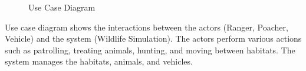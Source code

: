 \documentclass[a4paper,12pt]{article}
\begin{document}
\begin{figure}[H]
    \centering
    \caption{Use Case Diagram}
    \label{fig:use-case}
\end{figure}

\noindent Use case diagram shows the interactions between the actors (Ranger, Poacher, Vehicle) and the system (Wildlife Simulation). The actors perform various actions such as patrolling, treating animals, hunting, and moving between habitats. The system manages the habitats, animals, and vehicles.

\bigskip
\end{document}
